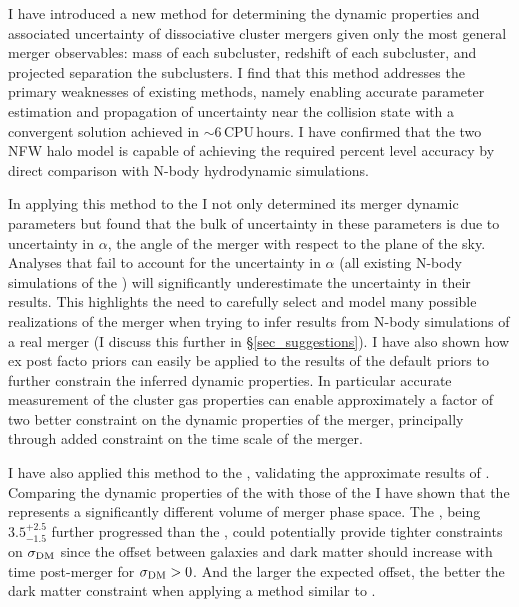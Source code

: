 \documentclass[12pt]{emulateapj}
\begin{document}
I have introduced a new method for determining the dynamic properties and associated uncertainty of dissociative cluster mergers given only the most general merger observables: mass of each subcluster, redshift of each subcluster, and projected separation the subclusters.
I find that this method addresses the primary weaknesses of existing methods, namely enabling accurate parameter estimation and propagation of uncertainty near the collision state with a convergent solution achieved in $\sim$6\,CPU\,hours. 
I have confirmed that the two NFW halo model is capable of achieving the required percent level accuracy by direct comparison with N-body hydrodynamic simulations.

In applying this method to the  I not only determined its merger dynamic parameters but found that the bulk of uncertainty in these parameters is due to uncertainty in $\alpha$, the angle of the merger with respect to the plane of the sky.
Analyses that fail to account for the uncertainty in $\alpha$ (all existing N-body simulations of the ) will significantly underestimate the uncertainty in their results.
This highlights the need to carefully select and model many possible realizations of the merger when trying to infer results from N-body simulations of a real merger (I discuss this further in \S\ref{sec_suggestions}).
I have also shown how ex post facto priors can easily be applied to the results of the default priors to further constrain the inferred dynamic properties.
In particular accurate measurement of the cluster gas properties can enable approximately a factor of two better constraint on the dynamic properties of the merger, principally through added constraint on the time scale of the merger.

I have also applied this method to the , validating the approximate results of \citet{Dawson:2012dl}.
Comparing the dynamic properties of the  with those of the  I have shown that the  represents a significantly different volume of merger phase space.
The , being $3.5^{+2.5}_{-1.5}$ further progressed than the , could potentially provide tighter constraints on $\sigma_{\rm DM}$ since the offset between galaxies and dark matter should increase with time post-merger for  $\sigma_{\rm DM}>0$.
And the larger the expected offset, the better the dark matter constraint when applying a method similar to \citet{Randall:2008hs}.
\end{document}
